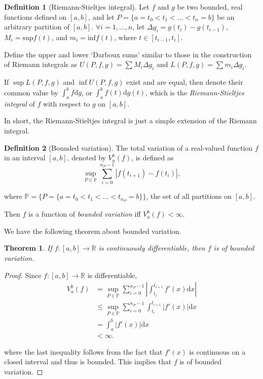 \documentclass[a4paper,11pt,titlepage]{article}
\theoremstyle{definition}
\newtheorem{definition}{Definition}[section]
\theoremstyle{plain}
\newtheorem{theorem}{Theorem}[section]
\theoremstyle{remark}
\begin{document}
\begin{definition}[Riemann-Stieltjes integral] Let $f$ and $g$ be two bounded, real functions defined on $[a,b]$, and let $P=\{a=t_0<t_1<\dots<t_n=b\}$ be an arbitrary partition of $[a,b]$. $\forall i = 1,\dots,n$, let $\Delta g_i = g(t_i) - g(t_{i-1})$, $M_i=\mathrm{sup}f(t)$, and $m_i=\mathrm{inf}f(t)$, where $t\in[t_{i-1},t_i]$.
    
    Define the upper and lower ‘Darboux sums’ similar to those in the construction of Riemann integrals as $U(P,f,g)=\sum M_i\Delta g_i$ and $L(P,f,g)=\sum m_i\Delta g_i$.

    If $\sup L(P,f,g)$ and $\inf U(P,f,g)$ exist and are equal, then denote their common value by $\int^b_af\mathrm{d}g$, or $\int^b_af(t)\mathrm{d}g(t)$, which is the \textit{Riemann-Stieltjes integral} of $f$ with respect to $g$ on $[a,b]$.
\end{definition}

In short, the Riemann-Stieltjes integral is just a simple extension of the Riemann integral.

\begin{definition}[Bounded variation] The total variation of a real-valued function $f$ in an interval $[a,b]$, denoted by $V_a^b(f)$, is defined as
$$\sup_{P\in\mathbb{P}}\sum_{i=0}^{n_P-1}\left|f(t_{i+1})-f(t_i)\right|,$$

where $\mathbb{P}=\{P=\{a=t_0<t_1<\dots<t_{n_P}=b\}\}$, the set of all partitions on $[a,b]$.

Then $f$ is a function of \textit{bounded variation} iff $V_a^b(f)<\infty$.
\end{definition}

We have the following theorem about bounded variation.
\begin{theorem}\label{bv}
    If $f:[a,b]\rightarrow\mathbb{R}$ is continuously differentiable, then $f$ is of bounded variation.
\end{theorem}
\begin{proof}
    Since $f:[a,b]\rightarrow\mathbb{R}$ is differentiable,
    \begin{align*}
    V_a^b(f) &= \sup_{P\in\mathbb{P}} \sum_{i=0}^{n_P-1} \left|\int_{t_i}^{t_{i+1}} f'(x)\mathrm{d}x\right| \\
    &\leq \sup_{P\in\mathbb{P}} \sum_{i=0}^{n_P-1} \int_{t_i}^{t_{i+1}} \left|f'(x)\right|\mathrm{d}x\\
    &= \int_a^b \left|f'(x)\right|\mathrm{d}x\\
    &< \infty.
    \end{align*}
    
    where the last inequality follows from the fact that $f'(x)$ is continuous on a closed interval and thus is bounded. This implies that $f$ is of bounded variation.
\end{proof}
\end{document}
